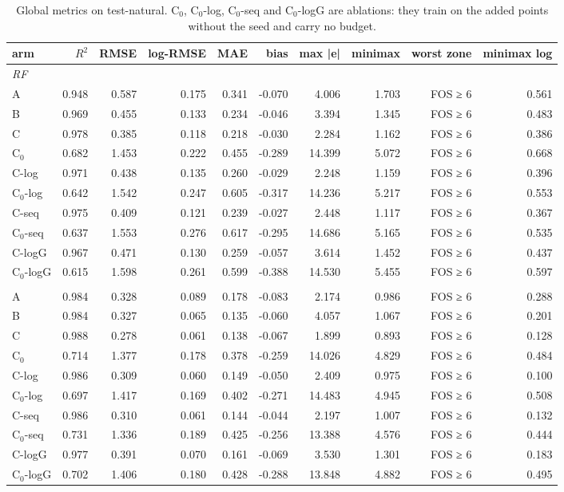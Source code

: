 \begin{table}[htbp]
\centering
\small
\setlength{\tabcolsep}{4pt}
\caption{Global metrics on test-natural. C$_0$, C$_0$-log, C$_0$-seq and C$_0$-logG are ablations: they train on the added points without the seed and carry no budget.}
\label{tab:test-natural__fos-rmse:global}
\begin{tabular}{lrrrrrrrrr}
\toprule
arm & $R^2$ & RMSE & log-RMSE & MAE & bias & max |e| & minimax & worst zone & minimax log \\
\midrule
\multicolumn{10}{l}{\textit{RF}} \\
A & 0.948 & 0.587 & 0.175 & 0.341 & -0.070 & 4.006 & 1.703 & FOS ≥ 6 & 0.561 \\
B & 0.969 & 0.455 & 0.133 & 0.234 & -0.046 & 3.394 & 1.345 & FOS ≥ 6 & 0.483 \\
C & 0.978 & 0.385 & 0.118 & 0.218 & -0.030 & 2.284 & 1.162 & FOS ≥ 6 & 0.386 \\
C$_0$ & 0.682 & 1.453 & 0.222 & 0.455 & -0.289 & 14.399 & 5.072 & FOS ≥ 6 & 0.668 \\
C-log & 0.971 & 0.438 & 0.135 & 0.260 & -0.029 & 2.248 & 1.159 & FOS ≥ 6 & 0.396 \\
C$_0$-log & 0.642 & 1.542 & 0.247 & 0.605 & -0.317 & 14.236 & 5.217 & FOS ≥ 6 & 0.553 \\
C-seq & 0.975 & 0.409 & 0.121 & 0.239 & -0.027 & 2.448 & 1.117 & FOS ≥ 6 & 0.367 \\
C$_0$-seq & 0.637 & 1.553 & 0.276 & 0.617 & -0.295 & 14.686 & 5.165 & FOS ≥ 6 & 0.535 \\
C-logG & 0.967 & 0.471 & 0.130 & 0.259 & -0.057 & 3.614 & 1.452 & FOS ≥ 6 & 0.437 \\
C$_0$-logG & 0.615 & 1.598 & 0.261 & 0.599 & -0.388 & 14.530 & 5.455 & FOS ≥ 6 & 0.597 \\
\addlinespace
\multicolumn{10}{l}{\textit{GBM}} \\
A & 0.984 & 0.328 & 0.089 & 0.178 & -0.083 & 2.174 & 0.986 & FOS ≥ 6 & 0.288 \\
B & 0.984 & 0.327 & 0.065 & 0.135 & -0.060 & 4.057 & 1.067 & FOS ≥ 6 & 0.201 \\
C & 0.988 & 0.278 & 0.061 & 0.138 & -0.067 & 1.899 & 0.893 & FOS ≥ 6 & 0.128 \\
C$_0$ & 0.714 & 1.377 & 0.178 & 0.378 & -0.259 & 14.026 & 4.829 & FOS ≥ 6 & 0.484 \\
C-log & 0.986 & 0.309 & 0.060 & 0.149 & -0.050 & 2.409 & 0.975 & FOS ≥ 6 & 0.100 \\
C$_0$-log & 0.697 & 1.417 & 0.169 & 0.402 & -0.271 & 14.483 & 4.945 & FOS ≥ 6 & 0.508 \\
C-seq & 0.986 & 0.310 & 0.061 & 0.144 & -0.044 & 2.197 & 1.007 & FOS ≥ 6 & 0.132 \\
C$_0$-seq & 0.731 & 1.336 & 0.189 & 0.425 & -0.256 & 13.388 & 4.576 & FOS ≥ 6 & 0.444 \\
C-logG & 0.977 & 0.391 & 0.070 & 0.161 & -0.069 & 3.530 & 1.301 & FOS ≥ 6 & 0.183 \\
C$_0$-logG & 0.702 & 1.406 & 0.180 & 0.428 & -0.288 & 13.848 & 4.882 & FOS ≥ 6 & 0.495 \\
\bottomrule
\end{tabular}
\end{table}

